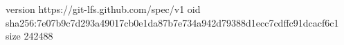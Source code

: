 version https://git-lfs.github.com/spec/v1
oid sha256:7e07b9c7d293a49017cb0e1da87b7e734a942d79388d1ecc7cdffc91dcacf6c1
size 242488
